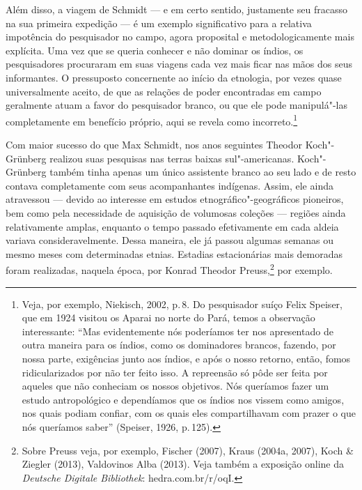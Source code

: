 Além disso, a viagem de Schmidt --- e em certo sentido, justamente seu
fracasso na sua primeira expedição --- é um exemplo significativo para a
relativa impotência do pesquisador no campo, agora proposital e
metodologicamente mais explícita. Uma vez que se queria conhecer e não
dominar os índios, os pesquisadores procuraram em suas viagens cada vez
mais ficar nas mãos dos seus informantes. O pressuposto concernente ao
início da etnologia, por vezes quase universalmente aceito, de que as
relações de poder encontradas em campo geralmente atuam a favor do
pesquisador branco, ou que ele pode manipulá"-las completamente em
benefício próprio, aqui se revela como incorreto.\footnote{Veja, por
  exemplo, Niekisch, 2002, p.\,8. Do pesquisador suíço Felix Speiser, que em
  1924 visitou os Aparai no norte do Pará, temos a observação
  interessante: ``Mas evidentemente nós poderíamos ter nos apresentado
  de outra maneira para os índios, como os dominadores brancos, fazendo,
  por nossa parte, exigências junto aos índios, e após o nosso retorno,
  então, fomos ridicularizados por não ter feito isso. A repreensão só
  pôde ser feita por aqueles que não conheciam os nossos objetivos. Nós
  queríamos fazer um estudo antropológico e dependíamos que os índios
  nos vissem como amigos, nos quais podiam confiar, com os quais eles
  compartilhavam com prazer o que nós queríamos saber'' (Speiser, 1926,
  p.\,125).}

Com maior sucesso do que Max Schmidt, nos anos seguintes Theodor
Koch"-Grünberg realizou suas pesquisas nas terras baixas
sul"-americanas. Koch"-Grünberg também tinha apenas um único assistente
branco ao seu lado e de resto contava completamente com seus
acompanhantes indígenas. Assim, ele ainda atravessou --- devido ao
interesse em estudos etnográfico"-geográficos pioneiros, bem como pela
necessidade de aquisição de volumosas coleções --- regiões ainda
relativamente amplas, enquanto o tempo passado efetivamente em cada
aldeia variava consideravelmente. Dessa maneira, ele já passou algumas
semanas ou mesmo meses com determinadas etnias. Estadias estacionárias
mais demoradas foram realizadas, naquela época, por Konrad Theodor
Preuss,\footnote{Sobre Preuss veja, por exemplo, Fischer
  (2007), Kraus (2004a, 2007), Koch \& Ziegler (2013), Valdovinos Alba
  (2013). Veja também a exposição online da \textit{Deutsche Digitale
  Bibliothek}: hedra.com.br/r/oqI.} por exemplo.

